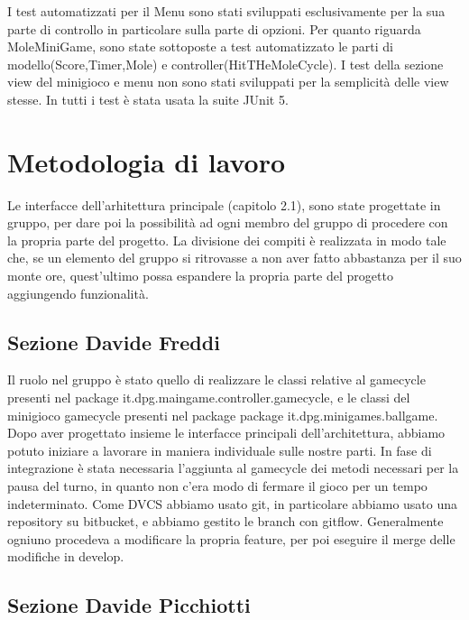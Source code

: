 \documentclass[a4paper,12pt]{report}
\begin{document}
	I test automatizzati per il Menu sono stati sviluppati esclusivamente per la sua parte di controllo in particolare sulla parte di opzioni.
    	Per quanto riguarda MoleMiniGame, sono state sottoposte a test automatizzato le parti di modello(Score,Timer,Mole) e controller(HitTHeMoleCycle).
    	I test della sezione view del minigioco e menu non sono stati sviluppati per la semplicità delle view stesse.
    	In tutti i test è stata usata la suite JUnit 5.

	\section{Metodologia di lavoro}

    Le interfacce dell'arhitettura principale (capitolo 2.1), sono state progettate in gruppo, per dare poi la possibilità ad ogni membro del gruppo di procedere con la propria parte del progetto.
    La divisione dei compiti è realizzata in modo tale che, se un elemento del gruppo si ritrovasse a non aver fatto abbastanza per il suo monte ore, quest'ultimo possa espandere la propria parte del progetto aggiungendo funzionalità.

	\subsection{Sezione Davide Freddi}

	Il ruolo nel gruppo è stato quello di realizzare le classi relative al gamecycle presenti nel package it.dpg.maingame.controller.gamecycle, e le classi del minigioco gamecycle presenti nel package package it.dpg.minigames.ballgame.
    Dopo aver progettato insieme le interfacce principali dell'architettura, abbiamo potuto iniziare a lavorare in maniera individuale sulle nostre parti.
    In fase di integrazione è stata necessaria l'aggiunta al gamecycle dei metodi necessari per la pausa del turno, in quanto non c'era modo di fermare il gioco per un tempo indeterminato.
    Come DVCS abbiamo usato git, in particolare abbiamo usato una repository su bitbucket, e abbiamo gestito le branch con gitflow.
    Generalmente ogniuno procedeva a modificare la propria feature, per poi eseguire il merge delle modifiche in develop.

	\subsection{Sezione Davide Picchiotti}
\end{document}
